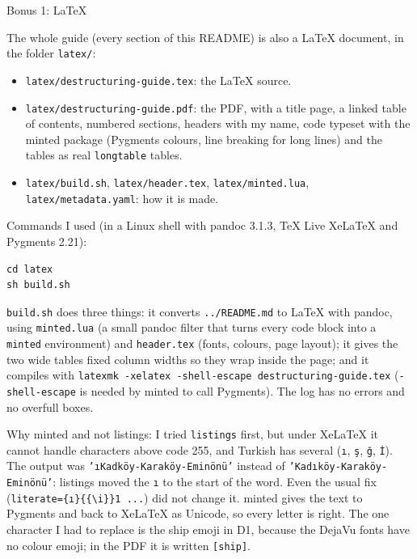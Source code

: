 \documentclass[
  10pt,
]{article}
\providecommand{\tightlist}{%
  \setlength{\itemsep}{0pt}\setlength{\parskip}{0pt}}
\begin{document}
Bonus 1: LaTeX

The whole guide (every section of this README) is also a LaTeX document,
in the folder \texttt{latex/\allowbreak{}}:

\begin{itemize}
\tightlist
\item
  \texttt{latex/\allowbreak{}destructuring-guide.\allowbreak{}tex}: the
  LaTeX source.
\item
  \texttt{latex/\allowbreak{}destructuring-guide.\allowbreak{}pdf}: the
  PDF, with a title page, a linked table of contents, numbered sections,
  headers with my name, code typeset with the minted package (Pygments
  colours, line breaking for long lines) and the tables as real
  \texttt{longtable} tables.
\item
  \texttt{latex/\allowbreak{}build.\allowbreak{}sh},
  \texttt{latex/\allowbreak{}header.\allowbreak{}tex},
  \texttt{latex/\allowbreak{}minted.\allowbreak{}lua},
  \texttt{latex/\allowbreak{}metadata.\allowbreak{}yaml}: how it is
  made.
\end{itemize}

Commands I used (in a Linux shell with pandoc 3.1.3, TeX Live XeLaTeX
and Pygments 2.21):

\begin{verbatim}
cd latex
sh build.sh
\end{verbatim}

\texttt{build.\allowbreak{}sh} does three things: it converts
\texttt{.\allowbreak{}.\allowbreak{}/\allowbreak{}README.\allowbreak{}md}
to LaTeX with pandoc, using \texttt{minted.\allowbreak{}lua} (a small
pandoc filter that turns every code block into a \texttt{minted}
environment) and \texttt{header.\allowbreak{}tex} (fonts, colours, page
layout); it gives the two wide tables fixed column widths so they wrap
inside the page; and it compiles with
\texttt{latexmk -xelatex -shell-escape destructuring-guide.\allowbreak{}tex}
(\texttt{-shell-escape} is needed by minted to call Pygments). The log
has no errors and no overfull boxes.

Why minted and not listings: I tried \texttt{listings} first, but under
XeLaTeX it cannot handle characters above code 255, and Turkish has
several (\texttt{ı}, \texttt{ş}, \texttt{ğ}, \texttt{İ}). The output was
\texttt{'ıKadköy-Karaköy-Eminönü'} instead of
\texttt{'Kadıköy-Karaköy-Eminönü'}: listings moved the \texttt{ı} to the
start of the word. Even the usual fix
(\texttt{literate=\allowbreak{}\{ı\}\{\{\textbackslash{}i\}\}1 .\allowbreak{}.\allowbreak{}.\allowbreak{}})
did not change it. minted gives the text to Pygments and back to XeLaTeX
as Unicode, so every letter is right. The one character I had to replace
is the ship emoji in D1, because the DejaVu fonts have no colour emoji;
in the PDF it is written \texttt{[\allowbreak{}ship]}.
\end{document}
